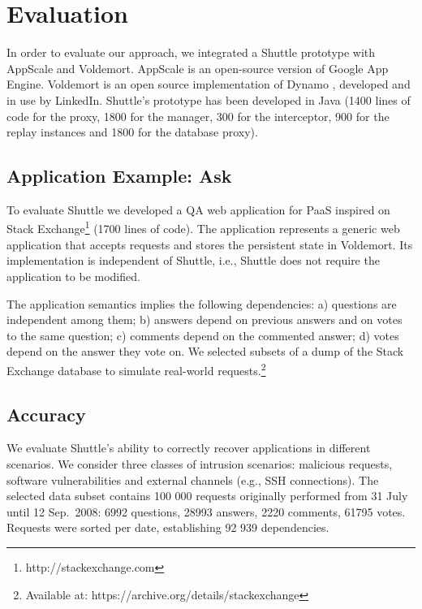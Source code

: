 
\section{Evaluation}
\label{sec:evaluation}


In order to evaluate our approach, we integrated a Shuttle prototype with AppScale and Voldemort. AppScale \cite{Appscale} is an open-source version of Google App Engine. Voldemort \cite{Kreps} is an open source implementation of Dynamo \cite{Decandia2007}, developed and in use by LinkedIn. Shuttle’s prototype has been developed in Java (1400 lines of code for the proxy, 1800 for the manager, 300 for the interceptor, 900 for the replay instances and 1800 for the database proxy).


\subsection{Application Example: Ask}
\label{sec:evaluation:app}

To evaluate Shuttle we developed a \acf{QA} web application for \ac{PaaS} inspired on Stack Exchange\footnote{http://stackexchange.com} (1700 lines of code). The application represents a generic web application that accepts requests and stores the persistent state in  Voldemort. Its implementation is independent of Shuttle, i.e., Shuttle does not require the application to be modified. 

The application semantics implies the following dependencies: a) questions are independent among them; b) answers depend on previous answers and on votes to the same question; c) comments depend on the commented answer; d) votes depend on the answer they vote on. We selected subsets of a dump of the Stack Exchange database to simulate real-world requests.\footnote{Available at: https://archive.org/details/stackexchange} 

\subsection{Accuracy}
\label{sec:evaluation:accuracy}

We evaluate Shuttle's ability to correctly recover applications in different scenarios. We consider three classes of intrusion scenarios: malicious requests, software vulnerabilities and external channels (e.g., SSH connections). The selected data subset contains 100 000 requests originally performed from 31 July until 12 Sep.~2008: 6992 questions, 28993 answers, 2220 comments, 61795 votes. Requests were sorted per date, establishing 92 939 dependencies.

